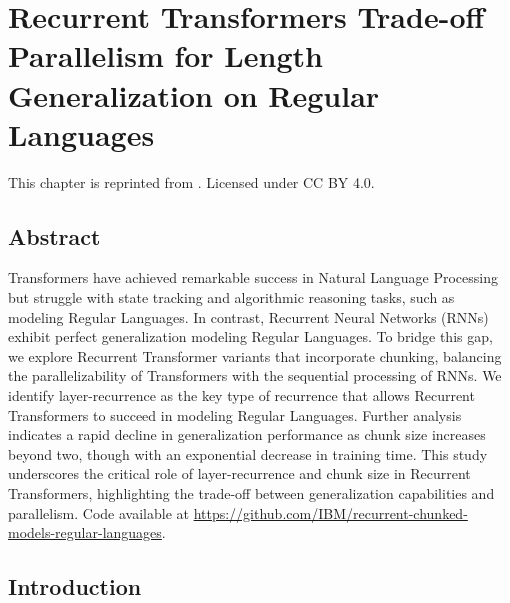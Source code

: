 
\chapter{Recurrent Transformers Trade-off Parallelism for Length Generalization on Regular Languages} \label{chap:chap-4}


\begin{singlespace}         %
    This chapter is reprinted from . Licensed under CC BY 4.0.
\end{singlespace} 

\section{Abstract}
    Transformers have achieved remarkable success in Natural Language Processing but struggle with state tracking and algorithmic reasoning tasks, such as modeling Regular Languages. In contrast, Recurrent Neural Networks (RNNs) exhibit perfect generalization modeling Regular Languages. To bridge this gap, we explore Recurrent Transformer variants that incorporate chunking, balancing the parallelizability of Transformers with the sequential processing of RNNs. We identify layer-recurrence as the key type of recurrence that allows Recurrent Transformers to succeed in modeling Regular Languages. Further analysis indicates a rapid decline in generalization performance as chunk size increases beyond two, though with an exponential decrease in training time. This study underscores the critical role of layer-recurrence and chunk size in Recurrent Transformers, highlighting the trade-off between generalization capabilities and parallelism. Code available at \url{https://github.com/IBM/recurrent-chunked-models-regular-languages}.%
    
    \section{Introduction}
    
